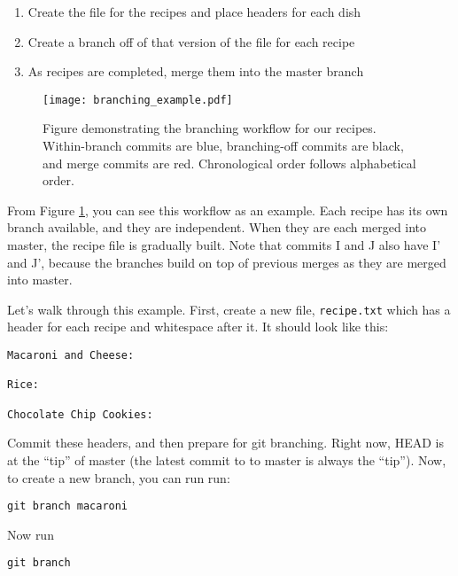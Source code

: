 \begin{enumerate}
    \item Create the file for the recipes and place headers for each dish
    \item Create a branch off of that version of the file for each recipe
    \item As recipes are completed, merge them into the master branch
\end{enumerate}

\begin{figure}
\begin{centering}
\texttt{[image: branching\_example.pdf]}
\caption{Figure demonstrating the branching workflow for our recipes.
Within-branch commits are blue, branching-off commits are black, and merge
commits are red. Chronological order follows alphabetical order.}
\label{fig:branching_recipe}
\end{centering}
\end{figure}

\par{
From Figure \ref{fig:branching_recipe}, you can see this workflow as an
example. Each recipe has its own branch available, and they are independent.
When they are each merged into master, the recipe file is gradually built.
Note that commits I and J also have I' and J', because the branches build on
top of previous merges as they are merged into master.  
}

\par{
Let's walk through this example. First, create a new file, \verb+recipe.txt+
which has a header for each recipe and whitespace after it. It should look
like this:
}

\begin{verbatim}
Macaroni and Cheese:

Rice:

Chocolate Chip Cookies:

\end{verbatim}

\par{
Commit these headers, and then prepare for git branching. Right now, HEAD is
at the ``tip'' of master (the latest commit to to master is always the
``tip''). Now, to create a new branch, you can run run:
}

\begin{verbatim}
git branch macaroni
\end{verbatim}

Now run

\begin{verbatim}
git branch
\end{verbatim}


